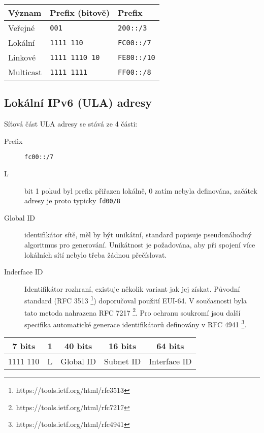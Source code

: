 \documentclass[a4paper,11pt,draft]{article}
\begin{document}
\begin{table}[ht!]
    \begin{center}
        \begin{tabular}{l|l|l}
            Význam & Prefix (bitově) & Prefix \\
            \hline\hline
            Veřejné  & {\tt 001} & {\tt 200::/3} \\
            \hline
            Lokální  & {\tt 1111 110} & {\tt FC00::/7} \\
            \hline
            Linkové  & {\tt 1111 1110 10} & {\tt FE80::/10} \\
            \hline
            Multicast & {\tt 1111 1111} & {\tt FF00::/8} \\
            \hline
        \end{tabular}
    \end{center}
\end{table}

\subsection{Lokální IPv6 (ULA) adresy}\label{ula}
Síťová část ULA adresy se stává ze 4 části:
\begin{description}
    \item [Prefix] {\tt fc00::/7}
    \item [L] bit 1 pokud byl prefix přiřazen lokálně, 0 zatím nebyla
        definována, začátek adresy je proto typicky {\tt fd00/8}
    \item [Global ID] identifikátor sítě, měl by být unikátní, standard
        popisuje pseudonáhodný algoritmus pro generování. Unikátnost je
        požadována, aby při spojení více lokálních sítí nebylo třeba žádnou
        přečíslovat.
    \item [Inderface ID] Identifikátor rozhraní, existuje několik variant jak
        jej získat. Původní standard (RFC 3513
        \footnote{https://tools.ietf.org/html/rfc3513}) doporučoval použití
        EUI-64. V současnosti byla tato metoda nahrazena RFC 7217
        \footnote{https://tools.ietf.org/html/rfc7217}. Pro ochranu soukromí
        jsou další specifika automatické generace identifikátorů definovány v
        RFC 4941 \footnote{https://tools.ietf.org/html/rfc4941}.
\end{description}

\begin{table}[ht!]
    \begin{center}
        \begin{tabular}{c|c|c|c|c}
            7 bits & 1 &  40 bits  &  16 bits  & 64 bits \\
            \hline
            1111 110 & L & Global ID & Subnet ID & Interface ID \\
            \hline
        \end{tabular}
    \end{center}
\end{table}
\end{document}
